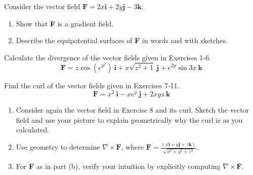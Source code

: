 \documentclass[12pt,letterpaper]{hmcpset}
\begin{document}

\begin{problem}[Colley 3.3.24]
    Consider the vector field
    $\textbf{F}=2x\textbf{i}+2y\textbf{j}-3\textbf{k}$.
    \begin{enumerate}
        \item Show that \textbf{F} is a gradient field.
        \item Describe the equipotential surfaces of \textbf{F} in
            words and with sketches.
    \end{enumerate}
\end{problem}
\begin{solution}
    \vfill
\end{solution}
\newpage

\begin{problem}[Colley 3.4.4]
    Calculate the divergence of the vector fields given in Exercises 1-6.
    \[
        \textbf{F}=z\cos(e^{y^2})\ \textbf{i}+x\sqrt{z^2+1}\ \textbf{j}
        +e^{2y}\sin3x\ \textbf{k}
    \]
\end{problem}
\begin{solution}
    \vfill
\end{solution}
\newpage

\begin{problem}[Colley 3.4.7]
    Find the curl of the vector fields given in Exercises 7-11.
    \[
        \textbf{F}=x^2\ \textbf{i}-xe^y\ \textbf{j}+2xyz\ \textbf{k}
    \]
\end{problem}
\begin{solution}
    \vfill
\end{solution}
\newpage

\begin{problem}[Colley 3.4.12]
    \begin{enumerate}
        \item Consider again the vector field in Exercise 8 and its
            curl. Sketch the vector field and use your picture to
            explain geometrically why the curl is as you calculated.
        \item Use geometry to determine $\nabla\times\textbf{F}$,
            where $\displaystyle\textbf{F}=\frac{(x\textbf{i}+y\textbf{j}
            +z\textbf{k})}{\sqrt{x^2+y^2+z^2}}$.
        \item For \textbf{F} as in part (b), verify your intuition by
            explicitly computing $\nabla\times\textbf{F}$.
    \end{enumerate}
\end{problem}
\begin{solution}
    \vfill
\end{solution}
\newpage
\end{document}
